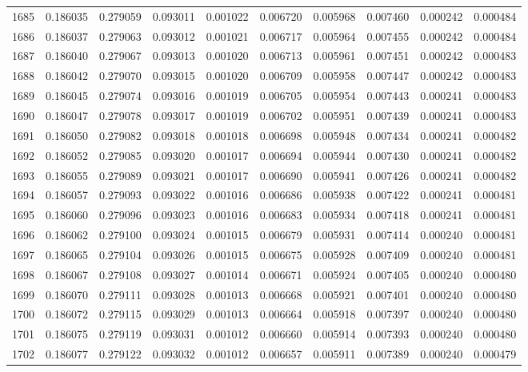 \begin{tabular}{lrrrrrrrrr}
1685 & 0.186035 & 0.279059 & 0.093011 & 0.001022 & 0.006720 & 0.005968 & 0.007460 & 0.000242 & 0.000484 \\
1686 & 0.186037 & 0.279063 & 0.093012 & 0.001021 & 0.006717 & 0.005964 & 0.007455 & 0.000242 & 0.000484 \\
1687 & 0.186040 & 0.279067 & 0.093013 & 0.001020 & 0.006713 & 0.005961 & 0.007451 & 0.000242 & 0.000483 \\
1688 & 0.186042 & 0.279070 & 0.093015 & 0.001020 & 0.006709 & 0.005958 & 0.007447 & 0.000242 & 0.000483 \\
1689 & 0.186045 & 0.279074 & 0.093016 & 0.001019 & 0.006705 & 0.005954 & 0.007443 & 0.000241 & 0.000483 \\
1690 & 0.186047 & 0.279078 & 0.093017 & 0.001019 & 0.006702 & 0.005951 & 0.007439 & 0.000241 & 0.000483 \\
1691 & 0.186050 & 0.279082 & 0.093018 & 0.001018 & 0.006698 & 0.005948 & 0.007434 & 0.000241 & 0.000482 \\
1692 & 0.186052 & 0.279085 & 0.093020 & 0.001017 & 0.006694 & 0.005944 & 0.007430 & 0.000241 & 0.000482 \\
1693 & 0.186055 & 0.279089 & 0.093021 & 0.001017 & 0.006690 & 0.005941 & 0.007426 & 0.000241 & 0.000482 \\
1694 & 0.186057 & 0.279093 & 0.093022 & 0.001016 & 0.006686 & 0.005938 & 0.007422 & 0.000241 & 0.000481 \\
1695 & 0.186060 & 0.279096 & 0.093023 & 0.001016 & 0.006683 & 0.005934 & 0.007418 & 0.000241 & 0.000481 \\
1696 & 0.186062 & 0.279100 & 0.093024 & 0.001015 & 0.006679 & 0.005931 & 0.007414 & 0.000240 & 0.000481 \\
1697 & 0.186065 & 0.279104 & 0.093026 & 0.001015 & 0.006675 & 0.005928 & 0.007409 & 0.000240 & 0.000481 \\
1698 & 0.186067 & 0.279108 & 0.093027 & 0.001014 & 0.006671 & 0.005924 & 0.007405 & 0.000240 & 0.000480 \\
1699 & 0.186070 & 0.279111 & 0.093028 & 0.001013 & 0.006668 & 0.005921 & 0.007401 & 0.000240 & 0.000480 \\
1700 & 0.186072 & 0.279115 & 0.093029 & 0.001013 & 0.006664 & 0.005918 & 0.007397 & 0.000240 & 0.000480 \\
1701 & 0.186075 & 0.279119 & 0.093031 & 0.001012 & 0.006660 & 0.005914 & 0.007393 & 0.000240 & 0.000480 \\
1702 & 0.186077 & 0.279122 & 0.093032 & 0.001012 & 0.006657 & 0.005911 & 0.007389 & 0.000240 & 0.000479 \\

\end{tabular}
